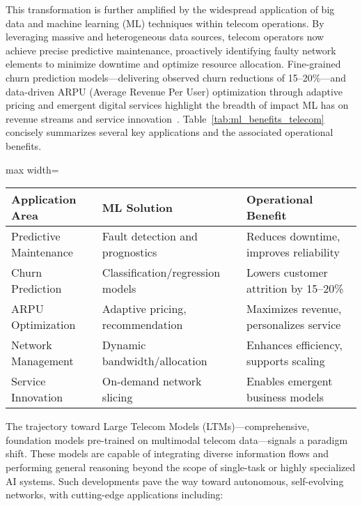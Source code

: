 This transformation is further amplified by the widespread application of big data and machine learning (ML) techniques within telecom operations. By leveraging massive and heterogeneous data sources, telecom operators now achieve precise predictive maintenance, proactively identifying faulty network elements to minimize downtime and optimize resource allocation. Fine-grained churn prediction models---delivering observed churn reductions of 15--20\%---and data-driven ARPU (Average Revenue Per User) optimization through adaptive pricing and emergent digital services highlight the breadth of impact ML has on revenue streams and service innovation~\cite{ref19,ref29}. Table~\ref{tab:ml_benefits_telecom} concisely summarizes several key applications and the associated operational benefits.

\begin{table*}[htbp]
\centering
\caption{Major Machine Learning Applications in Telecom Operations and Their Primary Benefits}
\label{tab:ml_benefits_telecom}
\begin{adjustbox}{max width=\textwidth}
\begin{tabular}{lll}
\toprule
\textbf{Application Area} & \textbf{ML Solution} & \textbf{Operational Benefit} \\
\midrule
Predictive Maintenance & Fault detection and prognostics & Reduces downtime, improves reliability \\
Churn Prediction & Classification/regression models & Lowers customer attrition by 15--20\% \\
ARPU Optimization & Adaptive pricing, recommendation & Maximizes revenue, personalizes service \\
Network Management & Dynamic bandwidth/allocation & Enhances efficiency, supports scaling \\
Service Innovation & On-demand network slicing & Enables emergent business models \\
\bottomrule
\end{tabular}
\end{adjustbox}
\end{table*}

The trajectory toward Large Telecom Models (LTMs)---comprehensive, foundation models pre-trained on multimodal telecom data---signals a paradigm shift. These models are capable of integrating diverse information flows and performing general reasoning beyond the scope of single-task or highly specialized AI systems. Such developments pave the way toward autonomous, self-evolving networks, with cutting-edge applications including:

